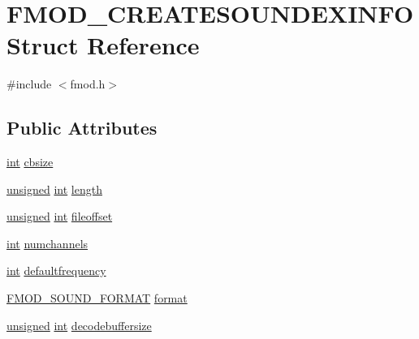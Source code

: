 \hypertarget{struct_f_m_o_d___c_r_e_a_t_e_s_o_u_n_d_e_x_i_n_f_o}{\section{F\-M\-O\-D\-\_\-\-C\-R\-E\-A\-T\-E\-S\-O\-U\-N\-D\-E\-X\-I\-N\-F\-O Struct Reference}
\label{struct_f_m_o_d___c_r_e_a_t_e_s_o_u_n_d_e_x_i_n_f_o}
}


{\ttfamily \#include $<$fmod.\-h$>$}

\subsection*{Public Attributes}
\begin{DoxyCompactItemize}
\item 
\hyperlink{wglew_8h_a500a82aecba06f4550f6849b8099ca21}{int} \hyperlink{struct_f_m_o_d___c_r_e_a_t_e_s_o_u_n_d_e_x_i_n_f_o_a905941acdbc5922a694fbb44761a1fa6}{cbsize}
\item 
\hyperlink{_free_image_8h_a425076c7067a1b5166e2cc530e914814}{unsigned} \hyperlink{wglew_8h_a500a82aecba06f4550f6849b8099ca21}{int} \hyperlink{struct_f_m_o_d___c_r_e_a_t_e_s_o_u_n_d_e_x_i_n_f_o_a4747dfdcc1a5b3aa8429b265655a0745}{length}
\item 
\hyperlink{_free_image_8h_a425076c7067a1b5166e2cc530e914814}{unsigned} \hyperlink{wglew_8h_a500a82aecba06f4550f6849b8099ca21}{int} \hyperlink{struct_f_m_o_d___c_r_e_a_t_e_s_o_u_n_d_e_x_i_n_f_o_a7b44d4b86cadbcd0b82f7103312d64ae}{fileoffset}
\item 
\hyperlink{wglew_8h_a500a82aecba06f4550f6849b8099ca21}{int} \hyperlink{struct_f_m_o_d___c_r_e_a_t_e_s_o_u_n_d_e_x_i_n_f_o_a07286cab031745284732e094ca8f722e}{numchannels}
\item 
\hyperlink{wglew_8h_a500a82aecba06f4550f6849b8099ca21}{int} \hyperlink{struct_f_m_o_d___c_r_e_a_t_e_s_o_u_n_d_e_x_i_n_f_o_abc2bb4d103afbbffb3cfdda4dc54b10b}{defaultfrequency}
\item 
\hyperlink{fmod_8h_a6192ea5a963e6b24689b53e96a946833}{F\-M\-O\-D\-\_\-\-S\-O\-U\-N\-D\-\_\-\-F\-O\-R\-M\-A\-T} \hyperlink{struct_f_m_o_d___c_r_e_a_t_e_s_o_u_n_d_e_x_i_n_f_o_a1cfd3a1633370ea3016f722f8c2531ce}{format}
\item 
\hyperlink{_free_image_8h_a425076c7067a1b5166e2cc530e914814}{unsigned} \hyperlink{wglew_8h_a500a82aecba06f4550f6849b8099ca21}{int} \hyperlink{struct_f_m_o_d___c_r_e_a_t_e_s_o_u_n_d_e_x_i_n_f_o_a854f54e774c81c959da15a09348af9bf}{decodebuffersize}

\end{DoxyCompactItemize}
